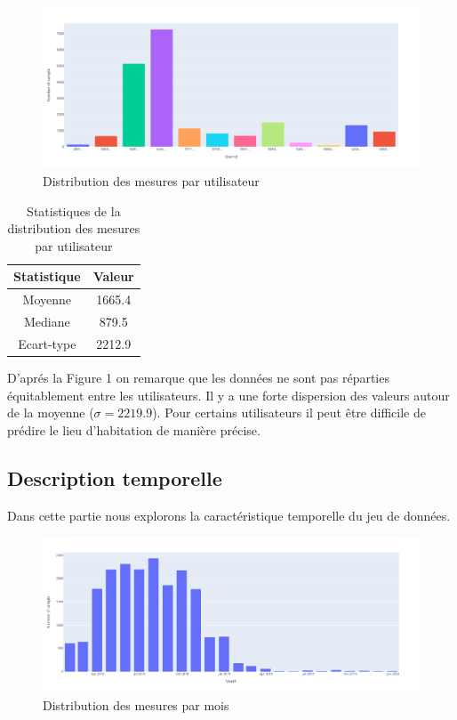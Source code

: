 \documentclass[10pt,a4paper]{article}
\begin{document}
\begin{figure}[H]
    \includegraphics[scale=0.3]{sample_per_user}
    \centering
    \caption{Distribution des mesures par utilisateur}
    \label{fig:figure1}
\end{figure}

\begin{table}[H]
    \begin{center}
        \begin{tabular}{|c|c|}
            \hline
            Statistique & Valeur \\
            \hline
            Moyenne     & 1665.4 \\
            Mediane     & 879.5  \\
            Ecart-type  & 2212.9 \\
            \hline
        \end{tabular}
        \caption{\label{tab:table2}Statistiques de la distribution des mesures par utilisateur}
    \end{center}
\end{table}

D'aprés la Figure 1 on remarque que les données ne sont pas réparties équitablement entre les utilisateurs.
Il y a une forte dispersion des valeurs autour de la moyenne (${\sigma=2219.9}$). Pour certains utilisateurs
il peut être difficile de prédire le lieu d'habitation de manière précise.

\vspace{5mm}
\subsection{Description temporelle}

Dans cette partie nous explorons la caractéristique temporelle du jeu de données.

\begin{figure}[H]
    \includegraphics[scale=0.3]{sample_per_month}
    \centering
    \caption{Distribution des mesures par mois}
    \label{fig:figure2}
\end{figure}
\end{document}
